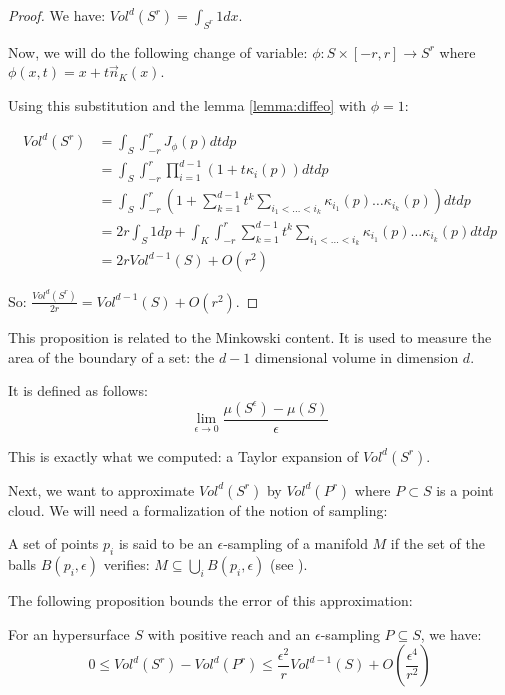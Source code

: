 \begin{proof}
    We have: $ Vol^d(S^r) = \int_{S^r} 1 dx $.

    Now, we will do the following change of variable: $ \phi : S \times [-r, r]
\rightarrow S^r $ where $ \phi(x, t) = x + t \vec{n}_K(x) $.

    Using this substitution and the lemma \ref{lemma:diffeo} with $ \phi = 1 $:

    \begin{align*}
        Vol^d(S^r) &= \int_S \int_{-r}^r J_{\phi}(p) dt dp \\
        &= \int_S \int_{-r}^r \prod_{i=1}^{d-1} (1 + t \kappa_i(p)) dt dp \\
        &= \int_S \int_{-r}^r \left( 1 + \sum_{k=1}^{d-1} t^k \sum_{i_1 < \ldots
                < i_k} \kappa_{i_1}(p) \ldots \kappa_{i_k}(p) \right) dt dp \\
        &= 2r \int_S 1 dp + \int_K \int_{-r}^r \sum_{k=1}^{d-1} t^k \sum_{i_1 < \ldots < i_k} \kappa_{i_1}(p) \ldots \kappa_{i_k}(p) dt dp \\
        &= 2r Vol^{d-1}(S) + O(r^2)
    \end{align*}

    So: $ \frac{Vol^d(S^r)}{2r} = Vol^{d-1}(S) + O(r^2) $.
\end{proof}

This proposition is related to the Minkowski content. It is used to measure the
area of the boundary of a set: the $ d-1 $ dimensional volume in dimension $ d
$.

It is defined as follows:
$$ \lim\limits_{\epsilon \to 0} \frac{\mu(S^{\epsilon}) - \mu(S)}{\epsilon} $$

This is exactly what we computed: a Taylor expansion of $ Vol^d(S^r) $.

Next, we want to approximate $ Vol^d(S^r) $ by $ Vol^d(P^r) $ where $ P \subset
S $ is a point cloud. We will need a formalization of the notion of sampling:

\begin{definition}
    A set of points $ p_i $ is said to be an $\epsilon$-sampling of a manifold $
    M $ if the set of the balls  $ B(p_i, \epsilon) $ verifies: $ M \subseteq
    \bigcup_i B(p_i, \epsilon) $ (see \cite{amenta1999surface}).
\end{definition}

The following proposition bounds the error of this approximation:

\begin{proposition}
    \label{prop:comp-vol-offsets}
    For an hypersurface $ S $ with positive reach and an $\epsilon$-sampling $ P
    \subseteq S $, we have:
    $$ 0 \leq Vol^d(S^r) - Vol^d(P^r) \leq \frac{\epsilon^2}{r} Vol^{d-1}(S) +
    O(\frac{\epsilon^4}{r^2}) $$
\end{proposition}

